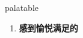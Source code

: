
\begin{frame}
{\huge palatable}
\begin{center}
\begin{enumerate}\Large
  \item \textbf{感到愉悦满足的}
\end{enumerate}
\end{center}
\end{frame}
